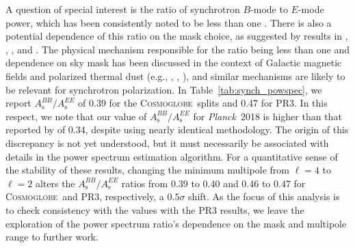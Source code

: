 \documentclass[twocolumn]{../../common/aa}
\def\Planck{\emph{Planck}}
\newcommand{\cosmoglobe}{\textsc{Cosmoglobe}}
\begin{document}
A question of special interest is the ratio of synchrotron $B$-mode to $E$-mode power, which has been consistently noted to be less than one \citep{page2007,planck2014-a12,planck2016-l04,krachmalnicoff2018,martire2022,QUIJOTE_IV,eimer2023}. There is also a potential dependence of this ratio on the mask choice, as suggested by results in \citet{krachmalnicoff2018}, \citet{martire2022}, \citet{QUIJOTE_IV}, and \citet{eimer2023}. The physical mechanism responsible for the ratio being less than one and dependence on sky mask has been discussed in the context of Galactic magnetic fields and polarized thermal dust (e.g., \citealp{kandel2017}, \citealp{so_galsci}, \citealp{vacher2023}), and similar mechanisms are likely to be relevant for synchrotron polarization. In Table~\ref{tab:synch_powspec}, we report $A_{\mathrm{s}}^{BB}/A_{\mathrm{s}}^{EE}$ of 0.39 for the \cosmoglobe\ splits and 0.47 for PR3. In this respect, we note that our value of $A_{\mathrm{s}}^{BB}/A_{\mathrm{s}}^{EE}$ for \Planck\ 2018 is higher than that reported by \citet{planck2016-l04} of 0.34, despite using nearly identical methodology. The origin of this discrepancy is not yet understood, but it must necessarily be associated with details in  the power spectrum estimation algorithm. For a quantitative sense of the stability of these results, changing the minimum multipole from $\ell=4$ to $\ell=2$ alters the $A_\mathrm{s}^{BB}/A_\mathrm{s}^{EE}$ ratios from 0.39 to 0.40 and 0.46 to 0.47 for \cosmoglobe\ and PR3, respectively, a $0.5\sigma$ shift.
As the focus of this analysis is to check consistency with the values with the PR3 results, we leave the exploration of the power spectrum ratio’s dependence on the mask and multipole range to further work.
\end{document}
